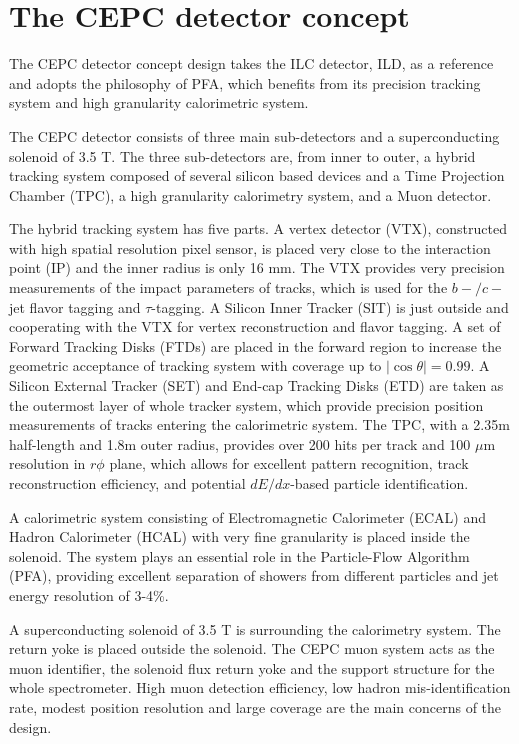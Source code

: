 \documentclass[a4paper,10pt,twoside]{cpc-hepnp}
\begin{document}
\section{The CEPC detector concept\label{sec:detector}}

The CEPC detector concept design\cite{ref:cepc_det} takes the ILC detector, ILD\cite{ref:ilc, ref:ild},
as a reference and adopts the philosophy of PFA,
which benefits from its precision tracking system and high granularity calorimetric system.

The CEPC detector consists of three main sub-detectors and a superconducting solenoid of 3.5 T.
The three sub-detectors are, from inner to outer,  a hybrid tracking system composed of several silicon based devices
and a Time Projection Chamber (TPC), a high granularity calorimetry system, and a Muon detector.

The hybrid tracking system has five parts. A vertex detector (VTX), constructed with high spatial resolution pixel sensor,
is placed very close to the interaction point (IP) and  the inner radius is only 16 mm.
The VTX provides very precision measurements of the impact parameters of tracks,
which is used for the $b-/c-$jet flavor tagging and $\tau$-tagging.
A Silicon Inner Tracker (SIT) is just outside and cooperating with the VTX for vertex reconstruction and flavor tagging.
A set of Forward Tracking Disks (FTDs) are placed in the forward region
to increase the geometric acceptance of tracking system with coverage up to $|\cos\theta| = 0.99$.
A Silicon External Tracker (SET) and End-cap Tracking Disks (ETD) are taken as the outermost layer of whole tracker system,
which provide precision position measurements of tracks entering the calorimetric system.
The TPC, with a 2.35m half-length and 1.8m outer radius, provides over 200 hits per track and 100 $\mu$m resolution in $r\phi$ plane,
which allows for excellent pattern recognition, track reconstruction efficiency, and potential $dE/dx$-based particle identification.

A calorimetric system consisting of Electromagnetic Calorimeter (ECAL) and Hadron Calorimeter (HCAL)
with very fine granularity is placed inside the solenoid.
The system plays an essential role in the Particle-Flow Algorithm (PFA),
providing excellent separation of showers from different particles and jet energy resolution of 3-4\%.

A superconducting solenoid of 3.5 T is surrounding the calorimetry system.
The return yoke is placed outside the solenoid. The CEPC muon system acts as the muon identifier,
the solenoid flux return yoke and the support structure for the whole spectrometer.
High muon detection efficiency, low hadron mis-identification rate,
modest position resolution and large coverage are the main concerns of the design.
\end{document}
